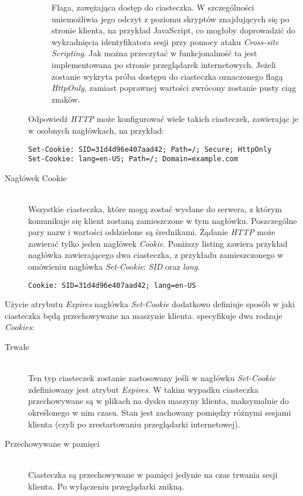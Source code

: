 \documentclass[11pt]{aghdpl}
\begin{document}
\begin{description}
\begin{description}
Flaga, zawężająca dostęp do ciasteczka. W szczególności uniemożliwia jego odczyt z poziomu skryptów znajdujących się po stronie klienta, na przykład JavaScript, co mogłoby doprowadzić do wykradnięcia identyfikatora sesji przy pomocy ataku \emph{Cross-site Scripting}. Jak można przeczytać w \cite{HtOn} funkcjonalność ta jest implementowana po stronie przeglądarek internetowych. Jeżeli zostanie wykryta próba dostępu do ciasteczka oznaczonego flagą \emph{HttpOnly}, zamiast poprawnej wartości zwrócony zostanie pusty ciąg znaków. 
\end{description}
Odpowiedź \emph{HTTP} może konfigurować wiele takich ciasteczek, zawierając je w osobnych nagłówkach, na przykład:
\begin{lstlisting}
Set-Cookie: SID=31d4d96e407aad42; Path=/; Secure; HttpOnly
Set-Cookie: lang=en-US; Path=/; Domain=example.com
\end{lstlisting}
\item[Nagłówek Cookie] \hfill \\
Wszystkie ciasteczka, które mogą zostać wysłane do serwera, z którym komunikuje się klient zostaną zamieszczone w tym nagłówku. Poszczególne pary nazw i wartości oddzielone są średnikami. Żądanie \emph{HTTP} może zawierać tylko jeden nagłówek \emph{Cookie}. Poniższy listing zawiera przykład nagłówka zawierającego dwa ciasteczka, z przykładu zamieszczonego w omówieniu nagłówka \emph{Set-Cookie}: \emph{SID} oraz \emph{lang}.
\begin{lstlisting}
Cookie: SID=31d4d96e407aad42; lang=en-US
\end{lstlisting}
\end{description}

Użycie atrybutu \emph{Expires} nagłówka \emph{Set-Cookie} dodatkowo definiuje sposób w jaki ciasteczka będą przechowywane na maszynie klienta. \cite{MsC} specyfikuje dwa rodzaje \emph{Cookies}:

\begin{description}
\item[Trwałe] \hfill \\
Ten typ ciasteczek zostanie zastosowany jeśli w nagłówku \emph{Set-Cookie} zdefiniowany jest atrybut \emph{Expires}. W takim wypadku ciasteczka przechowywane są w plikach na dysku maszyny klienta, maksymalnie do określonego w nim czasu. Stan jest zachowany pomiędzy różnymi sesjami klienta (czyli po zrestartowaniu przeglądarki internetowej).
\item[Przechowywane w pamięci] \hfill \\
Ciasteczka są przechowywane w pamięci jedynie na czas trwania sesji klienta. Po wyłączeniu przeglądarki znikną.
\end{description}
\end{document}
